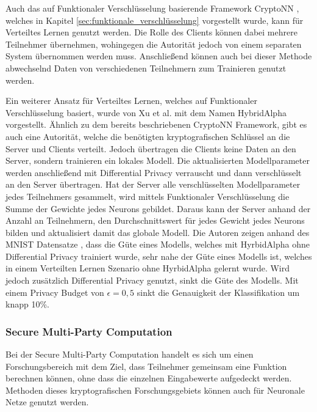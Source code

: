 Auch das auf Funktionaler Verschlüsselung basierende Framework CryptoNN \cite{P-53}, welches in Kapitel \ref{sec:funktionale_verschlüsselung} vorgestellt wurde, kann für Verteiltes Lernen genutzt werden. 
Die Rolle des Clients können dabei mehrere Teilnehmer übernehmen, wohingegen die Autorität jedoch von einem separaten System übernommen werden muss. 
Anschließend können auch bei dieser Methode abwechselnd Daten von verschiedenen Teilnehmern zum Trainieren genutzt werden.

Ein weiterer Ansatz für Verteiltes Lernen, welches auf Funktionaler Verschlüsselung basiert, wurde von Xu et al. \cite{P-33} mit dem Namen HybridAlpha vorgestellt.
Ähnlich zu dem bereits beschriebenen CryptoNN Framework, gibt es auch eine Autorität, welche die benötigten kryptografischen Schlüssel an die Server und Clients verteilt.
Jedoch übertragen die Clients keine Daten an den Server, sondern trainieren ein lokales Modell.
Die aktualisierten Modellparameter werden anschließend mit Differential Privacy verrauscht und dann verschlüsselt an den Server übertragen.
Hat der Server alle verschlüsselten Modellparameter jedes Teilnehmers gesammelt, wird mittels Funktionaler Verschlüsselung die Summe der Gewichte jedes Neurons gebildet.
Daraus kann der Server anhand der Anzahl an Teilnehmern, den Durchschnittswert für jedes Gewicht jedes Neurons bilden und aktualisiert damit das globale Modell.
Die Autoren zeigen anhand des MNIST Datensatze \cite{D-MNIST}, dass die Güte eines Modells, welches mit HyrbidAlpha ohne Differential Privacy trainiert wurde, sehr nahe der Güte eines Modells ist, welches in einem Verteilten Lernen Szenario ohne HyrbidAlpha gelernt wurde. 
Wird jedoch zusätzlich Differential Privacy genutzt, sinkt die Güte des Modells. 
Mit einem Privacy Budget von $\epsilon=0,5$ sinkt die Genauigkeit der Klassifikation um knapp 10\%.


\subsubsection*{Secure Multi-Party Computation}

Bei der Secure Multi-Party Computation handelt es sich um einen Forschungsbereich mit dem Ziel, dass Teilnehmer gemeinsam eine Funktion berechnen können, ohne dass die einzelnen Eingabewerte aufgedeckt werden. 
Methoden dieses kryptografischen Forschungsgebiets können auch für Neuronale Netze genutzt werden.

